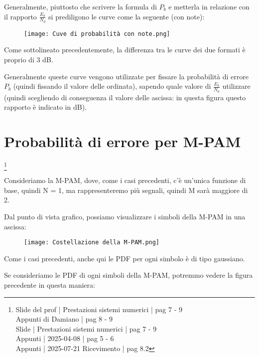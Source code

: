 Generalmente, piuttosto che scrivere la formula di $P_b$ e metterla in relazione con il rapporto $\frac{E_b}{N_0}$ 
si prediligono le curve come la seguente (con note): 

\begin{figure}[h]
    \centering
    \texttt{[image: Cuve di probabilità con note.png]}
\end{figure}

Come sottolineato precedentemente, la differenza tra le curve dei due formati è proprio di 3 dB. \newline 

Generalmente queste curve vengono utilizzate per fissare la probabilità di errore $P_b$ 
(quindi fissando il valore delle ordinata), 
sapendo quale valore di $\frac{E_b}{N_0}$ utilizzare 
(quindi scegliendo di conseguenza il valore delle ascissa: in questa figura questo rapporto è indicato in dB). \newline 

\newpage 

\section{Probabilità di errore per M-PAM}
\footnote{Slide del prof | Prestazioni sistemi numerici | pag 7 - 9 \\
Appunti di Damiano | pag 8 - 9 \\
Slide | Prestazioni sistemi numerici | pag 7 - 9 \\
Appunti | 2025-04-08 | pag 5 - 6 \\
Appunti | 2025-07-21 Ricevimento | pag 8.2
}

Consideriamo la M-PAM, dove, come i casi precedenti, c'è un'unica funzione di base, quindi N = 1, 
ma rappresenteremo più segnali, quindi M sarà maggiore di 2. \newline 

Dal punto di vista grafico, possiamo visualizzare i simboli della M-PAM in una ascissa: 

\begin{figure}[h]
    \centering
    \texttt{[image: Costellazione della M-PAM.png]}
\end{figure}

Come i casi precedenti, anche qui le PDF per ogni simbolo è di tipo gaussiano. \newline 

Se consideriamo le PDF di ogni simboli della M-PAM, 
potremmo vedere la figura precedente in questa maniera:

